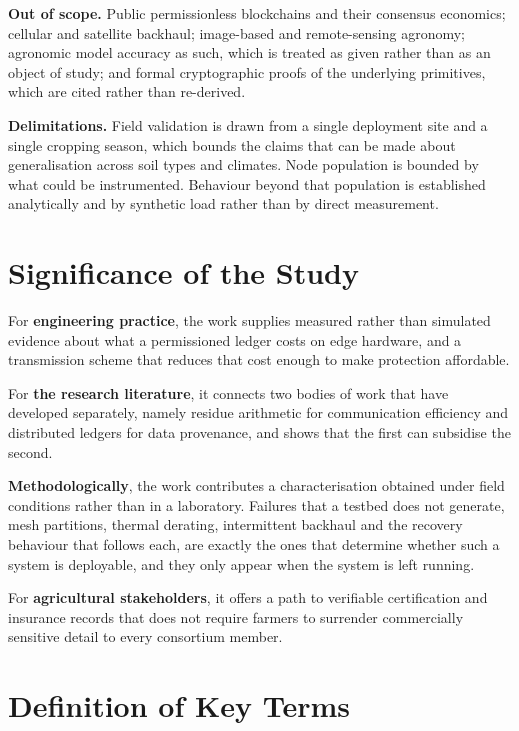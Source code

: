 \textbf{Out of scope.} Public permissionless blockchains and their consensus
economics; cellular and satellite backhaul; image-based and remote-sensing
agronomy; agronomic model accuracy as such, which is treated as given rather
than as an object of study; and formal cryptographic proofs of the underlying
primitives, which are cited rather than re-derived.

\textbf{Delimitations.} Field validation is drawn from a single deployment site
and a single cropping season, which bounds the claims that can be made about
generalisation across soil types and climates. Node population is bounded by
what could be instrumented. Behaviour beyond that population is established
analytically and by synthetic load rather than by direct measurement.

\section{Significance of the Study}
\label{sec:significance}

For \textbf{engineering practice}, the work supplies measured rather than
simulated evidence about what a permissioned ledger costs on edge hardware, and
a transmission scheme that reduces that cost enough to make protection
affordable.

For \textbf{the research literature}, it connects two bodies of work that have
developed separately, namely residue arithmetic for communication efficiency and
distributed ledgers for data provenance, and shows that the first can subsidise
the second.

\textbf{Methodologically}, the work contributes a characterisation obtained under
field conditions rather than in a laboratory. Failures that a testbed does not
generate, mesh partitions, thermal derating, intermittent backhaul and the
recovery behaviour that follows each, are exactly the ones that determine
whether such a system is deployable, and they only appear when the system is
left running.

For \textbf{agricultural stakeholders}, it offers a path to verifiable
certification and insurance records that does not require farmers to surrender
commercially sensitive detail to every consortium member.

\section{Definition of Key Terms}
\label{sec:definitions}

